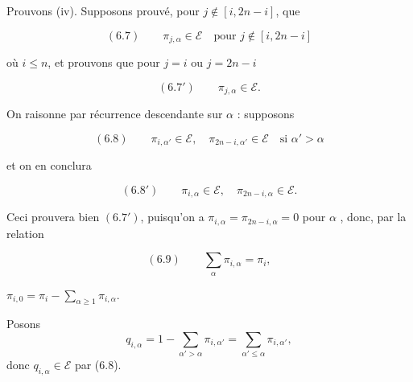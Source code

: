 
Prouvons (iv). Supposons prouvé, pour $j \notin [i, 2n-i]$, que

\[ (6.7) \qquad \pi_{j,\alpha} \in \mathcal{E} \quad \text{pour } j \notin [i, 2n-i] \]

où $i \leqslant n$, et prouvons que pour $j = i$ ou $j = 2n-i$

\[ (6.7') \qquad \pi_{j,\alpha} \in \mathcal{E} . \]


\ill{} On raisonne par récurrence descendante sur $\alpha$ : supposons

\[ (6.8) \qquad \pi_{i,\alpha'} \in \mathcal{E}, \quad \pi_{2n-i,\alpha'} \in \mathcal{E} \quad \text{si } \alpha' > \alpha \]

et on en conclura

\[ (6.8') \qquad \pi_{i,\alpha} \in \mathcal{E}, \quad \pi_{2n-i,\alpha} \in \mathcal{E} . \]

Ceci \struck{\ill{}} prouvera bien $(6.7')$, puisqu'on a $\pi_{i,\alpha} =
\pi_{2n-i,\alpha} = 0$ pour $\alpha$ \ill{}, donc, par la relation

\[ (6.9) \qquad \sum_{\alpha} \pi_{i,\alpha} = \pi_{i} , \]

$\pi_{i,0} = \pi_{i} - \sum_{\alpha \geqslant 1} \pi_{i,\alpha}$. \ill{}

Posons
\[ q_{i,\alpha} = 1 - \sum_{\alpha' > \alpha} \pi_{i,\alpha'} = \sum_{\alpha' \leqslant \alpha} \pi_{i,\alpha'} , \]
donc $q_{i,\alpha} \in \mathcal{E}$ par (6.8).

